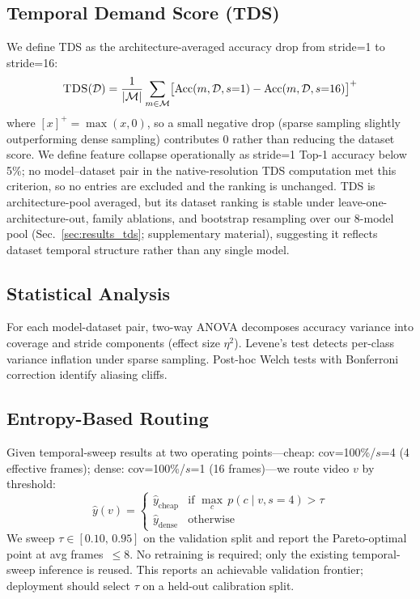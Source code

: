 \documentclass[runningheads]{llncs}
\newcommand{\TDS}{\textsc{TDS}}
\begin{document}
\subsection{Temporal Demand Score (\texorpdfstring{\TDS{}}{TDS})}

We define \TDS{} as the architecture-averaged accuracy drop from stride=1 to stride=16:
\begin{equation}
  \TDS(\mathcal{D}) = \frac{1}{|\mathcal{M}|} \sum_{m\in\mathcal{M}} \bigl[\mathrm{Acc}(m,\mathcal{D},s{=}1) - \mathrm{Acc}(m,\mathcal{D},s{=}16)\bigr]^+
  \label{eq:tds}
\end{equation}
where $[x]^+=\max(x,0)$, so a small negative drop (sparse sampling slightly outperforming dense sampling) contributes 0 rather than reducing the dataset score. We define feature collapse operationally as stride=1 Top-1 accuracy below 5\%; no model--dataset pair in the native-resolution \TDS{} computation met this criterion, so no entries are excluded and the ranking is unchanged. \TDS{} is architecture-pool averaged, but its dataset ranking is stable under leave-one-architecture-out, family ablations, and bootstrap resampling over our 8-model pool (Sec.~\ref{sec:results_tds}; supplementary material), suggesting it reflects dataset temporal structure rather than any single model.

\subsection{Statistical Analysis}

For each model-dataset pair, two-way ANOVA decomposes accuracy variance into coverage and stride components (effect size $\eta^2$). Levene's test detects per-class variance inflation under sparse sampling. Post-hoc Welch tests with Bonferroni correction identify aliasing cliffs.

\subsection{Entropy-Based Routing}

Given temporal-sweep results at two operating points---cheap: cov=100\%/$s$=4 (4 effective frames); dense: cov=100\%/$s$=1 (16 frames)---we route video $v$ by threshold: \[ \hat{y}(v) = \begin{cases}
    \hat{y}_\text{cheap} & \text{if } \max_c\,p(c\mid v,s{=}4) > \tau \\
    \hat{y}_\text{dense} & \text{otherwise}
  \end{cases}
\] We sweep $\tau\in[0.10,\,0.95]$ on the validation split and report the Pareto-optimal point at avg frames~$\leq8$. No retraining is required; only the existing temporal-sweep inference is reused. This reports an achievable validation frontier; deployment should select $\tau$ on a held-out calibration split.
\end{document}
